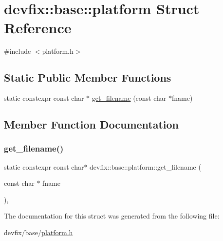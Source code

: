 \hypertarget{structdevfix_1_1base_1_1platform}{}\section{devfix\+:\+:base\+:\+:platform Struct Reference}
\label{structdevfix_1_1base_1_1platform}


{\ttfamily \#include $<$platform.\+h$>$}

\subsection*{Static Public Member Functions}
\begin{DoxyCompactItemize}
\item 
static constexpr const char $\ast$ \hyperlink{structdevfix_1_1base_1_1platform_a5d491c9eadd0e09eafda6263852d37e4}{get\+\_\+filename} (const char $\ast$fname)
\end{DoxyCompactItemize}


\subsection{Member Function Documentation}
\mbox{\label{structdevfix_1_1base_1_1platform_a5d491c9eadd0e09eafda6263852d37e4}} 
\subsubsection{\texorpdfstring{get\+\_\+filename()}{get\_filename()}}
{\footnotesize\ttfamily static constexpr const char$\ast$ devfix\+::base\+::platform\+::get\+\_\+filename (\begin{DoxyParamCaption}\item[{const char $\ast$}]{fname }\end{DoxyParamCaption})\hspace{0.3cm}{\ttfamily [inline]}, {\ttfamily [static]}}



The documentation for this struct was generated from the following file\+:\begin{DoxyCompactItemize}
\item 
devfix/base/\hyperlink{platform_8h}{platform.\+h}\end{DoxyCompactItemize}
